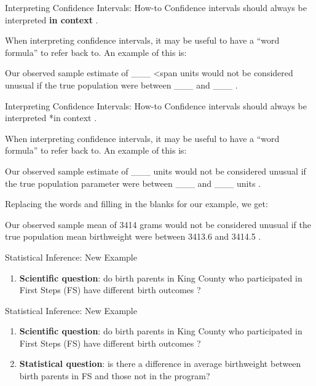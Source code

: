 \documentclass[
  ignorenonframetext,
]{beamer}
\providecommand{\tightlist}{%
  \setlength{\itemsep}{0pt}\setlength{\parskip}{0pt}}
\begin{document}
\begin{frame}{Interpreting Confidence Intervals: How-to}
\protect\hypertarget{interpreting-confidence-intervals-how-to}{}
Confidence intervals should always be interpreted \textbf{in context} .

When interpreting confidence intervals, it may be useful to have a
``word formula'' to refer back to. An example of this is:

Our observed sample estimate of \_\_\_ \textless span units would not be
considered unusual if the true population were between \_\_\_ and \_\_\_
.
\end{frame}

\begin{frame}{Interpreting Confidence Intervals: How-to}
\protect\hypertarget{interpreting-confidence-intervals-how-to-1}{}
Confidence intervals should always be interpreted *in context .

When interpreting confidence intervals, it may be useful to have a
``word formula'' to refer back to. An example of this is:

Our observed sample estimate of \_\_\_ units would not be considered
unusual if the true population parameter were between \_\_\_ and \_\_\_
units .

Replacing the words and filling in the blanks for our example, we get:

Our observed sample mean of 3414 grams would not be considered unusual
if the true population mean birthweight were between 3413.6 and 3414.5 .
\end{frame}

\begin{frame}{Statistical Inference: New Example}
\protect\hypertarget{statistical-inference-new-example}{}
\begin{enumerate}
\tightlist
\item
  \textbf{Scientific question}: do birth parents in King County who
  participated in First Steps (FS) have {different } {birth outcomes} ?
\end{enumerate}
\end{frame}

\begin{frame}{Statistical Inference: New Example}
\protect\hypertarget{statistical-inference-new-example-1}{}
\begin{enumerate}
\tightlist
\item
  \textbf{Scientific question}: do birth parents in King County who
  participated in First Steps (FS) have {different }{birth outcomes} ?
\item
  \textbf{Statistical question}: is there a {difference in average}
  {birthweight} between birth parents in FS and those not in the
  program?
\end{enumerate}
\end{frame}
\end{document}
